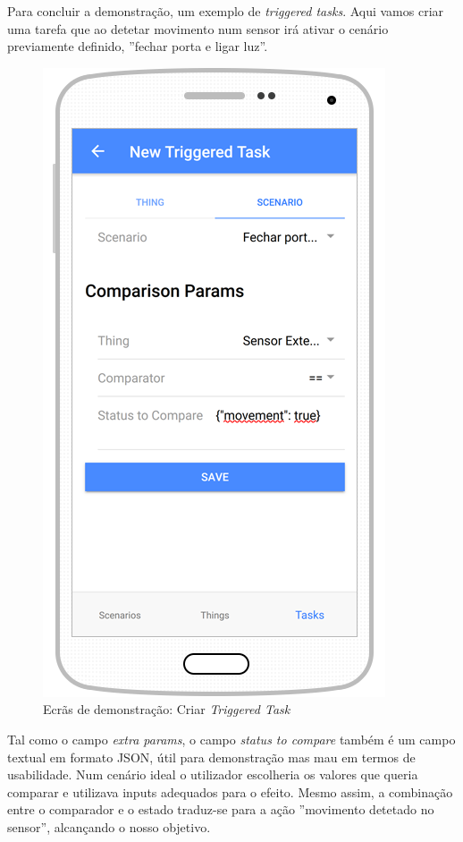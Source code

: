 Para concluir a demonstração, um exemplo de \textit{triggered tasks}. Aqui vamos criar uma tarefa que ao detetar movimento num sensor irá ativar o cenário previamente definido, ''fechar porta e ligar luz''. 

\begin{figure}[H]
  \centering
        \includegraphics[scale=0.6]{img/demo/new_triggered_task.png}
  \caption{Ecrãs de demonstração: Criar \textit{Triggered Task}}
\end{figure}

Tal como o campo \textit{extra params}, o campo \textit{status to compare} também é um campo textual em formato JSON, útil para demonstração mas mau em termos de usabilidade. Num cenário ideal o utilizador escolheria os valores que queria comparar e utilizava inputs adequados para o efeito. Mesmo assim, a combinação entre o comparador e o estado traduz-se para a ação ''movimento detetado no sensor'', alcançando o nosso objetivo.

